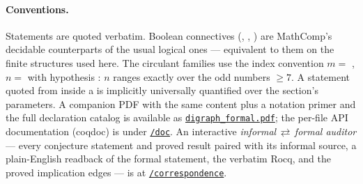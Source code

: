\paragraph{Conventions.} Statements are quoted verbatim. Boolean
connectives (\code{==}, \code{\&\&}, \code{[forall ...]}) are
MathComp's decidable counterparts of the usual logical ones ---
equivalent to them on the finite structures used here. The circulant
families use the index convention $m =$ ,
$n =$  with hypothesis : $n$ ranges
exactly over the odd numbers $\ge 7$. A statement quoted from inside
a  is implicitly universally quantified over the
section's parameters. A companion PDF with the same content plus a
notation primer and the full declaration catalog is available as
\href{https://llm4rocq.github.io/digraph-theory/digraph_formal.pdf}{\texttt{digraph\_formal.pdf}};
the per-file API documentation (coqdoc) is under
\href{https://llm4rocq.github.io/digraph-theory/doc}{\texttt{/doc}}.
An interactive \emph{informal\,$\rightleftarrows$\,formal auditor} --- every
conjecture statement and proved result paired with its informal source, a
plain-English readback of the formal statement, the verbatim Rocq, and the
proved implication edges --- is at
\href{https://llm4rocq.github.io/digraph-theory/correspondence/}{\texttt{/correspondence}}.
